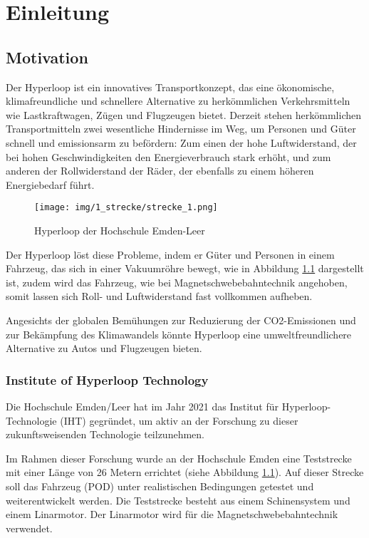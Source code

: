 \chapter{Einleitung}
\label{chapter:Einleitung}

\section{Motivation}
\label{section:Motivation}

Der Hyperloop ist ein innovatives Transportkonzept, das eine ökonomische, klimafreundliche und schnellere Alternative zu herkömmlichen Verkehrsmitteln wie Lastkraftwagen, Zügen und Flugzeugen bietet.
Derzeit stehen herkömmlichen Transportmitteln zwei wesentliche Hindernisse im Weg, um Personen und Güter schnell und emissionsarm zu befördern: Zum einen der hohe Luftwiderstand, der bei hohen Geschwindigkeiten den Energieverbrauch stark erhöht, und zum anderen der Rollwiderstand der Räder, der ebenfalls zu einem höheren Energiebedarf führt.
\begin{figure}[!ht]
	\begin{center}
		\texttt{[image: img/1\_strecke/strecke\_1.png]}
		\caption{Hyperloop der Hochschule Emden-Leer}
		\label{img_1_1:strecke}
	\end{center}
\end{figure}
\pagebreak[4]


Der Hyperloop löst diese Probleme, indem er Güter und Personen in einem Fahrzeug, das sich in einer Vakuumröhre bewegt, wie in Abbildung \ref{img_1_1:strecke} dargestellt ist, zudem wird das Fahrzeug, wie bei Magnetschwebebahntechnik angehoben, somit lassen sich Roll- und Luftwiderstand fast vollkommen aufheben.

Angesichts der globalen Bemühungen zur Reduzierung der CO2-Emissionen und zur Bekämpfung des Klimawandels könnte Hyperloop eine umweltfreundlichere Alternative zu Autos und Flugzeugen bieten.





\subsection{Institute of Hyperloop Technology}
\label{section:IHT}
Die Hochschule Emden/Leer hat im Jahr 2021 das Institut für Hyperloop-Technologie (IHT) gegründet, um aktiv an der Forschung zu dieser zukunftsweisenden Technologie teilzunehmen.

Im Rahmen dieser Forschung wurde an der Hochschule Emden eine Teststrecke mit einer Länge von 26 Metern errichtet (siehe Abbildung \ref{img_1_1:strecke}). Auf dieser Strecke soll das Fahrzeug (POD) unter realistischen Bedingungen getestet und weiterentwickelt werden.
Die Teststrecke besteht aus einem Schinensystem und einem Linarmotor. Der Linarmotor wird für die Magnetschwebebahntechnik verwendet.


